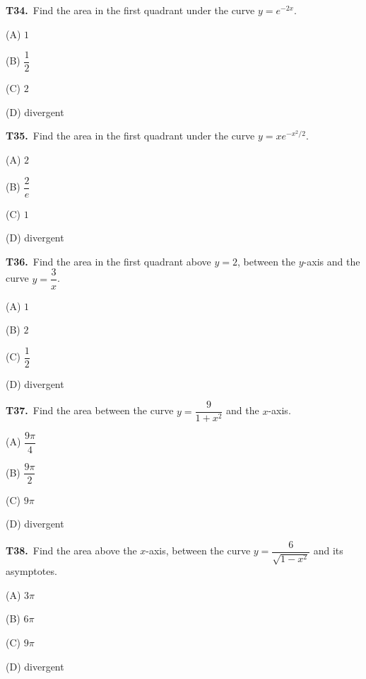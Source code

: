 \documentclass[11pt]{article}
\begin{document}
\bigskip\noindent\textbf{T34.}\ Find the area in the first quadrant under the curve $y=e^{-2x}$.
\begin{list}{}{\setlength{\leftmargin}{3em}\setlength{\labelwidth}{2.5em}\setlength{\itemsep}{0pt}\setlength{\topsep}{2pt}}
\item[(A)] $1$
\item[(B)] $\dfrac{1}{2}$
\item[(C)] $2$
\item[(D)] divergent
\end{list}

\bigskip\noindent\textbf{T35.}\ Find the area in the first quadrant under the curve $y=xe^{-x^2/2}$.
\begin{list}{}{\setlength{\leftmargin}{3em}\setlength{\labelwidth}{2.5em}\setlength{\itemsep}{0pt}\setlength{\topsep}{2pt}}
\item[(A)] $2$
\item[(B)] $\dfrac{2}{e}$
\item[(C)] $1$
\item[(D)] divergent
\end{list}

\bigskip\noindent\textbf{T36.}\ Find the area in the first quadrant above $y=2$, between the $y$-axis and the curve $y=\dfrac{3}{x}$.
\begin{list}{}{\setlength{\leftmargin}{3em}\setlength{\labelwidth}{2.5em}\setlength{\itemsep}{0pt}\setlength{\topsep}{2pt}}
\item[(A)] $1$
\item[(B)] $2$
\item[(C)] $\dfrac{1}{2}$
\item[(D)] divergent
\end{list}

\bigskip\noindent\textbf{T37.}\ Find the area between the curve $y=\dfrac{9}{1+x^2}$ and the $x$-axis.
\begin{list}{}{\setlength{\leftmargin}{3em}\setlength{\labelwidth}{2.5em}\setlength{\itemsep}{0pt}\setlength{\topsep}{2pt}}
\item[(A)] $\dfrac{9\pi}{4}$
\item[(B)] $\dfrac{9\pi}{2}$
\item[(C)] $9\pi$
\item[(D)] divergent
\end{list}

\bigskip\noindent\textbf{T38.}\ Find the area above the $x$-axis, between the curve $y=\dfrac{6}{\sqrt{1-x^2}}$ and its asymptotes.
\begin{list}{}{\setlength{\leftmargin}{3em}\setlength{\labelwidth}{2.5em}\setlength{\itemsep}{0pt}\setlength{\topsep}{2pt}}
\item[(A)] $3\pi$
\item[(B)] $6\pi$
\item[(C)] $9\pi$
\item[(D)] divergent
\end{list}
\end{document}

